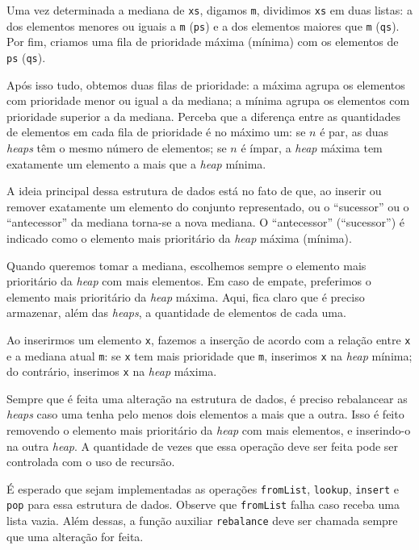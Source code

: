 \documentclass[a4paper]{article}
\begin{document}
Uma vez determinada a mediana de \texttt{xs}, digamos \texttt{m}, dividimos \texttt{xs} em duas listas: a dos elementos menores ou iguais a \texttt{m} (\texttt{ps}) e a dos elementos maiores que \texttt{m} (\texttt{qs}).
Por fim, criamos uma fila de prioridade máxima (mínima) com os elementos de \texttt{ps} (\texttt{qs}).

Após isso tudo, obtemos duas filas de prioridade:
a máxima agrupa os elementos com prioridade menor ou igual a da mediana;
a mínima agrupa os elementos com prioridade superior a da mediana.
Perceba que a diferença entre as quantidades de elementos em cada fila de prioridade é no máximo um:
se $n$ é par, as duas \emph{heaps} têm o mesmo número de elementos;
se $n$ é ímpar, a \emph{heap} máxima tem exatamente um elemento a mais que a \emph{heap} mínima.

A ideia principal dessa estrutura de dados está no fato de que, ao inserir ou remover exatamente um elemento do conjunto representado, ou o ``sucessor'' ou o ``antecessor'' da mediana torna-se a nova mediana.
O ``antecessor'' (``sucessor'') é indicado como o elemento mais prioritário da \emph{heap} máxima (mínima).

Quando queremos tomar a mediana, escolhemos sempre o elemento mais prioritário da \emph{heap} com mais elementos.
Em caso de empate, preferimos o elemento mais prioritário da \emph{heap} máxima.
Aqui, fica claro que é preciso armazenar, além das \emph{heaps}, a quantidade de elementos de cada uma.

Ao inserirmos um elemento \texttt{x}, fazemos a inserção de acordo com a relação entre \texttt{x} e a mediana atual \texttt{m}:
se \texttt{x} tem mais prioridade que \texttt{m}, inserimos \texttt{x} na \emph{heap} mínima;
do contrário, inserimos \texttt{x} na \emph{heap} máxima.

Sempre que é feita uma alteração na estrutura de dados, é preciso rebalancear as \emph{heaps} caso uma tenha pelo menos dois elementos a mais que a outra.
Isso é feito removendo o elemento mais prioritário da \emph{heap} com mais elementos, e inserindo-o na outra \emph{heap}.
A quantidade de vezes que essa operação deve ser feita pode ser controlada com o uso de recursão.

É esperado que sejam implementadas as operações \texttt{fromList}, \texttt{lookup}, \texttt{insert} e \texttt{pop} para essa estrutura de dados.
Observe que \texttt{fromList} falha caso receba uma lista vazia.
Além dessas, a função auxiliar \texttt{rebalance} deve ser chamada sempre que uma alteração for feita.
\end{document}
